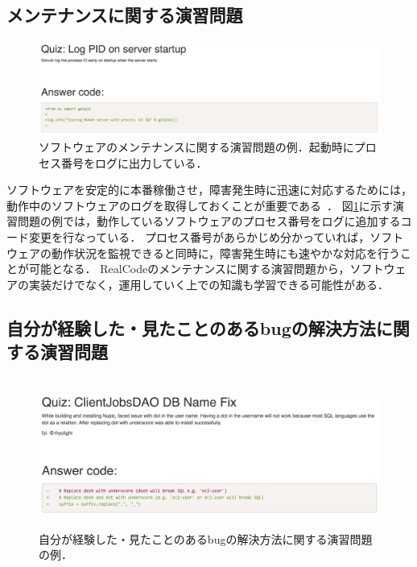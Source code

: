 \subsection{メンテナンスに関する演習問題}

\begin{figure}[t]
	\centering
  \includegraphics[width=1.0\columnwidth]{20190107-lab-study-maintenance-exercise.png}
  \caption{ソフトウェアのメンテナンスに関する演習問題の例．起動時にプロセス番号をログに出力している．}
  \label{fig:lab-study-eg-maintenance}
  \vspace{0.5cm}
\end{figure}

ソフトウェアを安定的に本番稼働させ，障害発生時に迅速に対応するためには，動作中のソフトウェアのログを取得しておくことが重要である~\cite{kernighan1999practice}．
図\ref{fig:lab-study-eg-maintenance}に示す演習問題の例では，動作しているソフトウェアのプロセス番号をログに追加するコード変更を行なっている．
プロセス番号があらかじめ分かっていれば，ソフトウェアの動作状況を監視できると同時に，障害発生時にも速やかな対応を行うことが可能となる．
RealCodeのメンテナンスに関する演習問題から，ソフトウェアの実装だけでなく，運用していく上での知識も学習できる可能性がある．

\subsection{自分が経験した・見たことのあるbugの解決方法に関する演習問題}

\begin{figure}[t]
　\centering
　\includegraphics[width=1.0\columnwidth]{20190107-lab-study-experience-exercise.png}
  \caption{自分が経験した・見たことのあるbugの解決方法に関する演習問題の例．}
  \label{fig:lab-study-eg-experience}
\end{figure}

